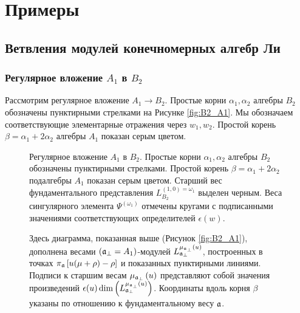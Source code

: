 \section{Примеры}
\label{sec:branching-examples}

\subsection{Ветвления модулей конечномерных алгебр Ли}
\label{sec:finite-dimens-lie}

\subsubsection{Регулярное вложение $A_1$ в $B_2$}
\label{sec:regul-embedd-a_1}

Рассмотрим регулярное вложение $A_1\to B_2$. Простые корни $\alpha_1, \alpha_2$ алгебры $B_2$ обозначены пунктирными стрелками на Рисунке \ref{fig:B2_A1}. Мы обозначаем соответствующие элементарные отражения через $w_1, w_2$. Простой корень $\beta = \alpha_1+2\alpha_2$ алгебры $A_1$ показан серым цветом.


\begin{figure}[p]
  \noindent{}
  \caption{Регулярное вложение  $A_1$ в $B_2$. Простые корни  $\alpha_1, \alpha_2$ алгебры $B_2$ обозначены пунктирными стрелками. Простой корень $\beta = \alpha_1+2\alpha_2$ подалгебры $A_1$ показан серым цветом. Старший вес фундаментального представления $L^{(1,0)=\omega_1}_{B_2}$ выделен черным. Веса сингулярного элемента $\Psi^{(\omega_1)}$ отмечены кругами с подписанными значениями соответствующих определителей $\epsilon(w)$.}
  \label{fig:B2_A1}

  \noindent{}
  \caption{Здесь диаграмма, показанная выше (Рисунок \ref{fig:B2_A1}), дополнена весами $\left( \mathfrak{a}_{\perp}=A_1 \right)$-модулей $L_{\mathfrak{a}_{\perp }}^{\mu_{\mathfrak{a}_{\perp }}\left( u\right) }$, построенных в точках $\pi _{\mathfrak{a}}\left[ u(\mu +\rho )-\rho \right] $ и показанных пунктирными линиями. 
    Подписи к старшим весам   $\mu_{\mathfrak{a}_{\perp }}\left( u\right)$ представляют собой значения произведений $\epsilon(u)\dim\left(L_{\mathfrak{a}_{\perp}}^{\mu_{\mathfrak{a}_{\perp }}\left( u\right) }\right)$.
    Координаты вдоль корня $\beta$ указаны по отношению к фундаментальному весу $\mathfrak{a}$. }
\label{fig:B2_A1_2}
\end{figure}

